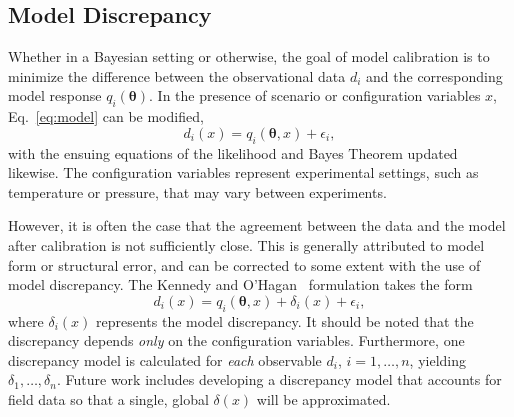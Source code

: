 \subsection{Model Discrepancy}
Whether in a Bayesian setting or otherwise, the goal of model calibration
is to minimize the difference between the observational data $d_i$ and 
the corresponding model response $q_i(\boldsymbol{\theta})$. In the 
presence of scenario or configuration variables $x$, Eq.~\ref{eq:model} can
be modified,
\begin{equation}
d_i(x) = q_i\left(\boldsymbol{\theta}, x\right) + \epsilon_i,
\end{equation} 
with the ensuing equations of the likelihood and Bayes Theorem updated 
likewise. The configuration variables represent experimental settings, such 
as temperature or pressure, that may vary between experiments. 

However, it is often the case that the agreement between the 
data and the model after calibration is not sufficiently close. This is 
generally attributed to model form or structural error, and can be corrected 
to some extent with the use of model discrepancy. The Kennedy and 
O'Hagan~\cite{Kenn01} formulation takes the form
\begin{equation}
d_i(x) = q_i\left(\boldsymbol{\theta}, x\right) + \delta_i(x) + \epsilon_i,
\end{equation} 
where $\delta_i(x)$ represents the model discrepancy. It should be noted that
the discrepancy depends \textit{only} on the configuration variables. 
Furthermore, one discrepancy model is calculated for \textit{each} observable
$d_i$, $i = 1, \ldots, n$, yielding $\delta_1, \ldots, \delta_n$. Future 
work includes developing a discrepancy model that accounts for field data so
that a single, global $\delta(x)$ will be approximated.

